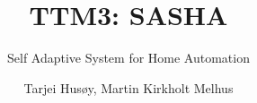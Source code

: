 \documentclass{scrartcl}
\begin{document}

\title{TTM3: SASHA} %
\subtitle{Self Adaptive System for Home Automation}
\author{Tarjei Husøy, Martin Kirkholt Melhus} %

\maketitle






\end{document}
